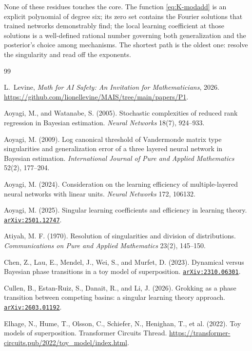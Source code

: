 \documentclass[11pt]{amsart}
\newcommand{\arxiv}[1]{\href{https://arxiv.org/abs/#1}{\texttt{arXiv:#1}}}
\theoremstyle{plain}
\theoremstyle{definition}
\begin{document}
None of these residues touches the core. The function \eqref{eq:K-modadd} is an explicit polynomial of degree six; its zero set contains the Fourier solutions that trained networks demonstrably find; the local learning coefficient at those solutions is a well-defined rational number governing both generalization and the posterior's choice among mechanisms. The shortest path is the oldest one: resolve the singularity and read off the exponents.

\begin{thebibliography}{99}

L.~Levine,
\emph{Math for AI Safety: An Invitation for Mathematicians},
2026. \url{https://github.com/lionellevine/MAIS/tree/main/papers/P1}.


Aoyagi, M., and Watanabe, S. (2005). Stochastic complexities of reduced rank regression in Bayesian estimation. \emph{Neural Networks} 18(7), 924--933.

Aoyagi, M. (2009). Log canonical threshold of Vandermonde matrix type singularities and generalization error of a three layered neural network in Bayesian estimation. \emph{International Journal of Pure and Applied Mathematics} 52(2), 177--204.

Aoyagi, M. (2024). Consideration on the learning efficiency of multiple-layered neural networks with linear units. \emph{Neural Networks} 172, 106132.

Aoyagi, M. (2025). Singular learning coefficients and efficiency in learning theory. \arxiv{2501.12747}.

Atiyah, M. F. (1970). Resolution of singularities and division of distributions. \emph{Communications on Pure and Applied Mathematics} 23(2), 145--150.

Chen, Z., Lau, E., Mendel, J., Wei, S., and Murfet, D. (2023). Dynamical versus Bayesian phase transitions in a toy model of superposition. \arxiv{2310.06301}.

Cullen, B., Estan-Ruiz, S., Danait, R., and Li, J. (2026). Grokking as a phase transition between competing basins: a singular learning theory approach. \arxiv{2603.01192}.

Elhage, N., Hume, T., Olsson, C., Schiefer, N., Henighan, T., et al. (2022). Toy models of superposition. Transformer Circuits Thread. \url{https://transformer-circuits.pub/2022/toy_model/index.html}.


\end{thebibliography}
\end{document}
